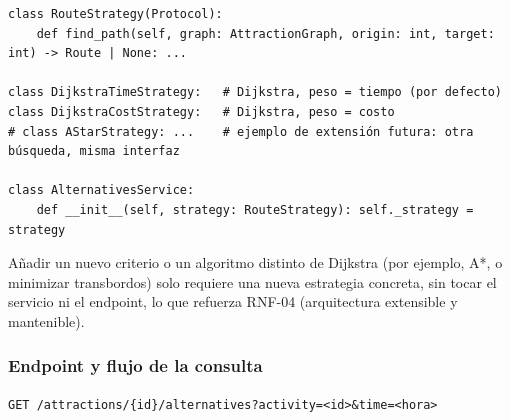 \documentclass[11pt,a4paper]{article}
\begin{document}
\vspace{2pt}
\begin{Verbatim}[fontsize=\scriptsize,frame=single,framesep=2mm]
class RouteStrategy(Protocol):
    def find_path(self, graph: AttractionGraph, origin: int, target: int) -> Route | None: ...

class DijkstraTimeStrategy:   # Dijkstra, peso = tiempo (por defecto)
class DijkstraCostStrategy:   # Dijkstra, peso = costo
# class AStarStrategy: ...    # ejemplo de extensión futura: otra búsqueda, misma interfaz

class AlternativesService:
    def __init__(self, strategy: RouteStrategy): self._strategy = strategy
\end{Verbatim}
Añadir un nuevo criterio o un algoritmo distinto de Dijkstra (por ejemplo, A*, o minimizar transbordos) solo requiere una nueva estrategia concreta, sin tocar el servicio ni el endpoint, lo que refuerza RNF-04 (arquitectura extensible y mantenible).

\subsubsection{Endpoint y flujo de la consulta}
\texttt{GET /attractions/\{id\}/alternatives?activity=<id>\&time=<hora>}
\end{document}
